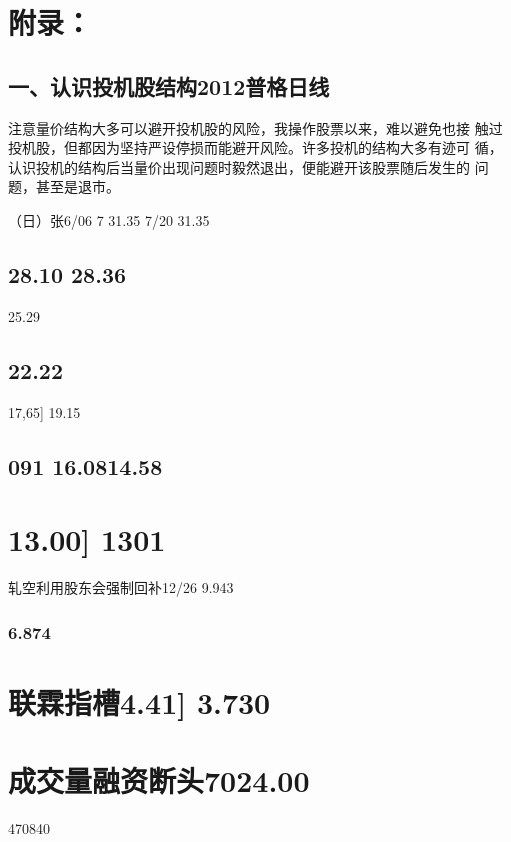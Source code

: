 \documentclass{article}
\begin{document}
\section{附录：}

\subsection{一、认识投机股结构2012普格日线}

注意量价结构大多可以避开投机股的风险，我操作股票以来，难以避免也接 触过投机股，但都因为坚持严设停损而能避开风险。许多投机的结构大多有迹可 循，认识投机的结构后当量价出现问题时毅然退出，便能避开该股票随后发生的 问题，甚至是退市。

（日）张6/06 7 31.35 7/20 31.35

\subsection{28.10 28.36}

25.29

\subsection{22.22}

17,65] 19.15

\subsection{091 16.0814.58}

\section{13.00] 1301}

轧空利用股东会强制回补12/26 9.943

\subsubsection{6.874}

\section{联霖指槽4.41] 3.730}

\section{成交量融资断头7024.00}

470840
\end{document}
